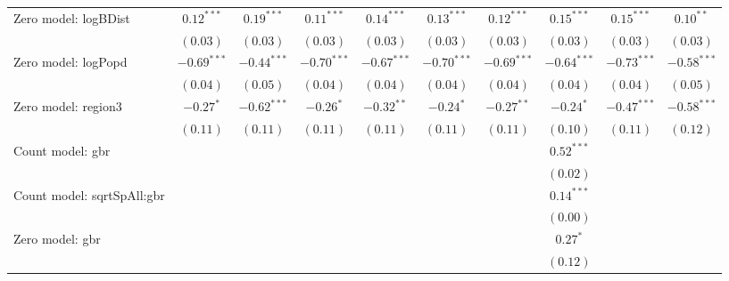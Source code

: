 \begin{sidewaystable}
\begin{center}
{\begin{tabular}{l c c c c c c c c c}
Zero model: logBDist           & $0.12^{***}$  & $0.19^{***}$  & $0.11^{***}$  & $0.14^{***}$    & $0.13^{***}$  & $0.12^{***}$  & $0.15^{***}$  & $0.15^{***}$   & $0.10^{**}$   \\
                               & $(0.03)$      & $(0.03)$      & $(0.03)$      & $(0.03)$        & $(0.03)$      & $(0.03)$      & $(0.03)$      & $(0.03)$       & $(0.03)$      \\
Zero model: logPopd            & $-0.69^{***}$ & $-0.44^{***}$ & $-0.70^{***}$ & $-0.67^{***}$   & $-0.70^{***}$ & $-0.69^{***}$ & $-0.64^{***}$ & $-0.73^{***}$  & $-0.58^{***}$ \\
                               & $(0.04)$      & $(0.05)$      & $(0.04)$      & $(0.04)$        & $(0.04)$      & $(0.04)$      & $(0.04)$      & $(0.04)$       & $(0.05)$      \\
Zero model: region3            & $-0.27^{*}$   & $-0.62^{***}$ & $-0.26^{*}$   & $-0.32^{**}$    & $-0.24^{*}$   & $-0.27^{**}$  & $-0.24^{*}$   & $-0.47^{***}$  & $-0.58^{***}$ \\
                               & $(0.11)$      & $(0.11)$      & $(0.11)$      & $(0.11)$        & $(0.11)$      & $(0.11)$      & $(0.10)$      & $(0.11)$       & $(0.12)$      \\
Count model: gbr               &               &               &               &                 &               &               & $0.52^{***}$  &                &               \\
                               &               &               &               &                 &               &               & $(0.02)$      &                &               \\
Count model: sqrtSpAll:gbr     &               &               &               &                 &               &               & $0.14^{***}$  &                &               \\
                               &               &               &               &                 &               &               & $(0.00)$      &                &               \\
Zero model: gbr                &               &               &               &                 &               &               & $0.27^{*}$    &                &               \\
                               &               &               &               &                 &               &               & $(0.12)$      &                &               \\

\end{tabular}}
\end{center}
\end{sidewaystable}
